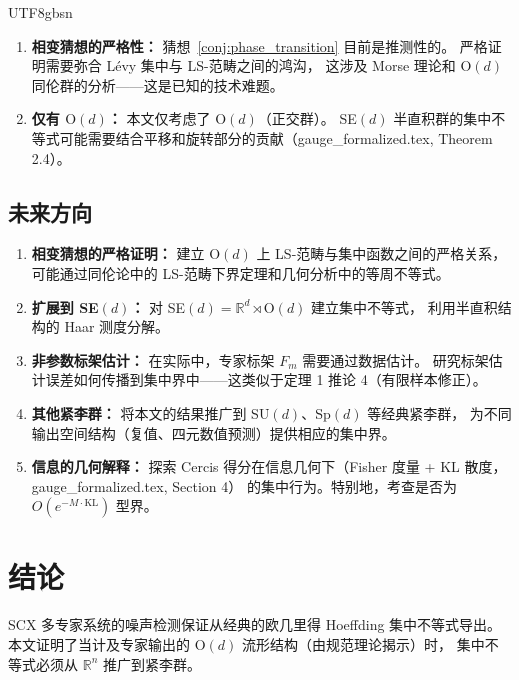 \documentclass[12pt,a4paper]{article}
\theoremstyle{plain}
\theoremstyle{definition}
\theoremstyle{remark}
\newcommand{\R}{\mathbb{R}}
\newcommand{\Od}{\mathrm{O}(d)}
\begin{document}
\begin{CJK}{UTF8}{gbsn}
\begin{enumerate}
    \item \textbf{相变猜想的严格性：} 猜想~\ref{conj:phase_transition} 目前是推测性的。
    严格证明需要弥合 L\'{e}vy 集中与 LS-范畴之间的鸿沟，
    这涉及 Morse 理论和 $\Od$ 同伦群的分析——这是已知的技术难题。

    \item \textbf{仅有 $\Od$：} 本文仅考虑了 $\Od$（正交群）。
    SE$(d)$ 半直积群的集中不等式可能需要结合平移和旋转部分的贡献（gauge\_formalized.tex, Theorem 2.4）。
\end{enumerate}

\subsection{未来方向}

\begin{enumerate}
    \item \textbf{相变猜想的严格证明：} 建立 $\Od$ 上 LS-范畴与集中函数之间的严格关系，
    可能通过同伦论中的 LS-范畴下界定理和几何分析中的等周不等式。

    \item \textbf{扩展到 SE$(d)$：} 对 SE$(d) = \R^d \rtimes \Od$ 建立集中不等式，
    利用半直积结构的 Haar 测度分解。

    \item \textbf{非参数标架估计：} 在实际中，专家标架 $F_m$ 需要通过数据估计。
    研究标架估计误差如何传播到集中界中——这类似于定理 1 推论 4（有限样本修正）。

    \item \textbf{其他紧李群：} 将本文的结果推广到 SU$(d)$、Sp$(d)$ 等经典紧李群，
    为不同输出空间结构（复值、四元数值预测）提供相应的集中界。

    \item \textbf{信息的几何解释：} 探索 Cercis 得分在信息几何下（Fisher 度量 + KL 散度，gauge\_formalized.tex, Section 4）
    的集中行为。特别地，考查是否为 $O(e^{-M \cdot \mathrm{KL}})$ 型界。
\end{enumerate}

\newpage

\section{结论}

SCX 多专家系统的噪声检测保证从经典的欧几里得 Hoeffding 集中不等式导出。
本文证明了当计及专家输出的 $\Od$ 流形结构（由规范理论揭示）时，
集中不等式必须从 $\R^n$ 推广到紧李群。


\end{CJK}
\end{document}
